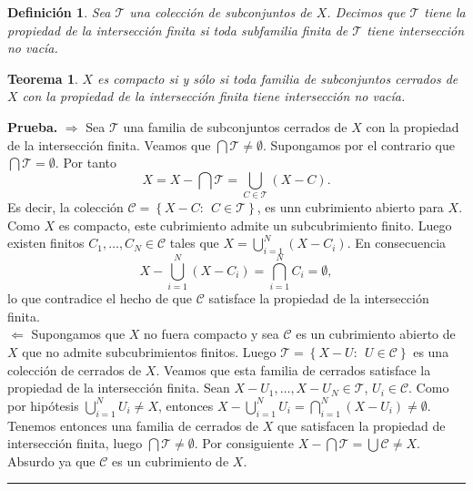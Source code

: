 \documentclass[x11names, 12pt]{book}
\newtheorem{definicion}{Definición}
\newtheorem{teorema}{Teorema}
\newenvironment{prueba}[1][Prueba]{\noindent\textbf{#1.} }{\ \rule{0.5em}{0.5em}}
\begin{document}
\begin{definicion}
Sea $\mathcal{T}$ una colección de subconjuntos de $X$. Decimos que $\mathcal{T}$ tiene la propiedad de la intersección finita si toda subfamilia finita de $\mathcal{T}$ tiene intersección no vacía.
\end{definicion}

\begin{teorema}
$X$ es compacto si y sólo si toda familia de subconjuntos cerrados de $X$ con la propiedad de la intersección finita tiene intersección no vacía.
\end{teorema}
\begin{prueba}
$\Rightarrow$ Sea $\mathcal{T}$ una familia de subconjuntos cerrados de $X$ con la propiedad de la intersección finita. Veamos que $\bigcap \mathcal{T} \neq \emptyset.$ Supongamos por el contrario que $\bigcap \mathcal{T} = \emptyset.$ Por tanto \[X=X-\bigcap \mathcal{T}=\bigcup_{C\in\mathcal{T}}(X-C).\]
Es decir, la colección $\mathcal{C}= \left\{  X-C: \ \ C\in \mathcal{T} \right\}$, es unn cubrimiento abierto para $X$. Como $X$ es compacto, este cubrimiento admite un subcubrimiento finito. Luego existen finitos $C_1, \dots ,C_N \in \mathcal{C}$ tales que \linebreak $X=\bigcup_{i=1}^N (X-C_i)$. En consecuencia \[X-\bigcup_{i=1}^N(X- C_i)=\bigcap_{i=1}^N C_i=\emptyset,\] lo que contradice el hecho de que $\mathcal{C}$ satisface la propiedad de la intersección finita.\\
$\Leftarrow$ Supongamos que $X$ no fuera compacto y sea $\mathcal{C}$ es un cubrimiento abierto de $X$ que no admite subcubrimientos finitos. Luego  $\mathcal{T}= \left\{ X-U: \ \ U\in \mathcal{C} \right\}$ es una colección de cerrados de $X$. Veamos que esta familia de cerrados satisface la propiedad de la intersección finita. Sean $X-U_1, \dots, X-U_N\in \mathcal{T}$, $U_i \in \mathcal{C}$. Como por hipótesis   $\bigcup_{i=1}^NU_i\neq X$, entonces $X-\bigcup_{i=1}^N U_i= \bigcap_{i=1}^N(X-U_i)\neq \emptyset$. Tenemos entonces una familia de cerrados de $X$ que satisfacen la propiedad de intersección finita, luego $\bigcap \mathcal{T}\neq \emptyset$. Por consiguiente $X-\bigcap \mathcal{T} =\bigcup \mathcal{C}\neq X$. Absurdo ya que $\mathcal{C}$ es un cubrimiento de $X$.
\end{prueba}
\end{document}
